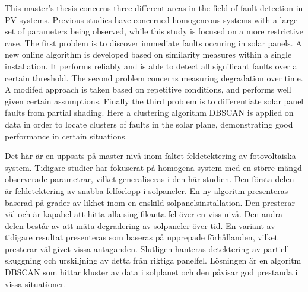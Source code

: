 \newenvironment{abstractpage}
  {\cleardoublepage\vspace*{\fill}\thispagestyle{empty}}
  {\vfill\cleardoublepage}
\newenvironment{polyAbstract}[1]
  {\bigskip\selectlanguage{#1}%
   \begin{center}\bfseries\abstractname\end{center}}
  {\par\bigskip}

\begin{abstractpage}
\begin{polyAbstract}{english}
This master's thesis concerns three different areas in the field of fault detection in PV systems.
Previous studies have concerned homogeneous systems with a large set of parameters being observed, while this study is focused on a more restrictive case.
The first problem is to discover immediate faults occuring in solar panels.
A new online algorithm is developed based on similarity measures within a single installation.
It performs reliably and is able to detect all significant faults over a certain threshold.
The second problem concerns measuring degradation over time.
A modifed approach is taken based on repetitive conditions, and performs well given certain assumptions.
Finally the third problem is to differentiate solar panel faults from partial shading.
Here a clustering algorithm DBSCAN is applied on data in order to locate clusters of faults in the solar plane, demonstrating good performance in certain situations.

\end{polyAbstract}

\begin{polyAbstract}{swedish}
Det här är en uppsats på master-nivå inom fältet feldetektering av fotovoltaiska system.
Tidigare studier har fokuserat på homogena system med en större mängd observerade parametrar, vilket generaliseras i den här studien.
Den första delen är feldetektering av snabba felförlopp i solpaneler.
En ny algoritm presenteras baserad på grader av likhet inom en enskild solpanelsinstallation.
Den presterar väl och är kapabel att hitta alla singifikanta fel över en viss nivå.
Den andra delen består av att mäta degradering av solpaneler över tid.
En variant av tidigare resultat presenteras som baseras på upprepade förhållanden, vilket presterar väl givet vissa antaganden.
Slutligen hanteras detektering av partiell skuggning och urskiljning av detta från riktiga panelfel.
Lösningen är en algoritm DBSCAN som hittar kluster av data i solplanet och den påvisar god prestanda i vissa situationer.

\end{polyAbstract}
\end{abstractpage}

